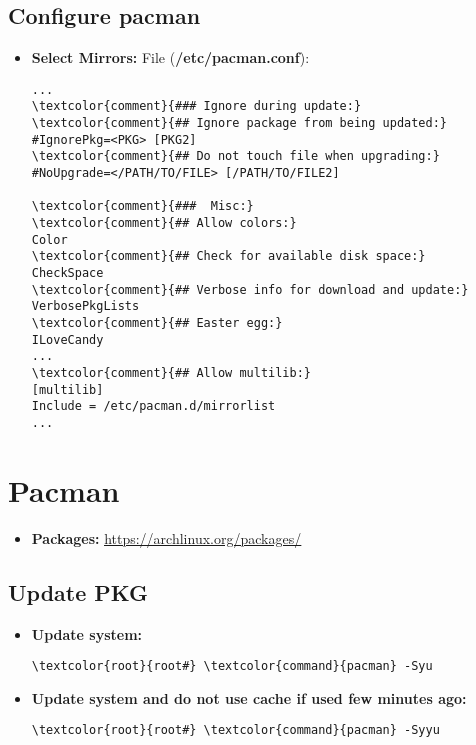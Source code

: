 \documentclass[10pt, a4paper, onecolumn, openany]{book} %
\begin{document}
\subsection{Configure pacman}
\begin{itemize}
    \item \textbf{Select Mirrors:}
\newline File (\textbf{\textcolor{file}{/etc/pacman.conf}}):
\begin{Verbatim}[commandchars=\\\{\}]
...
\textcolor{comment}{### Ignore during update:}
\textcolor{comment}{## Ignore package from being updated:}
#IgnorePkg=<PKG> [PKG2]
\textcolor{comment}{## Do not touch file when upgrading:}
#NoUpgrade=</PATH/TO/FILE> [/PATH/TO/FILE2]

\textcolor{comment}{###  Misc:}
\textcolor{comment}{## Allow colors:}
Color
\textcolor{comment}{## Check for available disk space:}
CheckSpace
\textcolor{comment}{## Verbose info for download and update:}
VerbosePkgLists
\textcolor{comment}{## Easter egg:}
ILoveCandy
...
\textcolor{comment}{## Allow multilib:}
[multilib]
Include = /etc/pacman.d/mirrorlist
...
\end{Verbatim}
\end{itemize}
\section{Pacman}
\begin{itemize}
    \item \textbf{Packages:}
\newline \underline{\href{https://archlinux.org/packages/}{https://archlinux.org/packages/}}
\end{itemize}
\subsection{Update PKG}
\begin{itemize}
    \item \textbf{Update system:}
\begin{Verbatim}[commandchars=\\\{\}]
\textcolor{root}{root#} \textcolor{command}{pacman} -Syu
\end{Verbatim}
    \item \textbf{Update system and do not use cache if used few minutes ago:}
\begin{Verbatim}[commandchars=\\\{\}]
\textcolor{root}{root#} \textcolor{command}{pacman} -Syyu
\end{Verbatim} 
\end{itemize}
\end{document}
